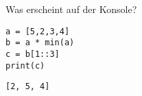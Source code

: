 \question[3]
Was erscheint auf der Konsole?
\begin{lstlisting}
a = [5,2,3,4]
b = a * min(a)
c = b[1::3]
print(c)
\end{lstlisting}
\begin{solutionbox}{1cm}
\texttt{[2, 5, 4]}
\end{solutionbox}
